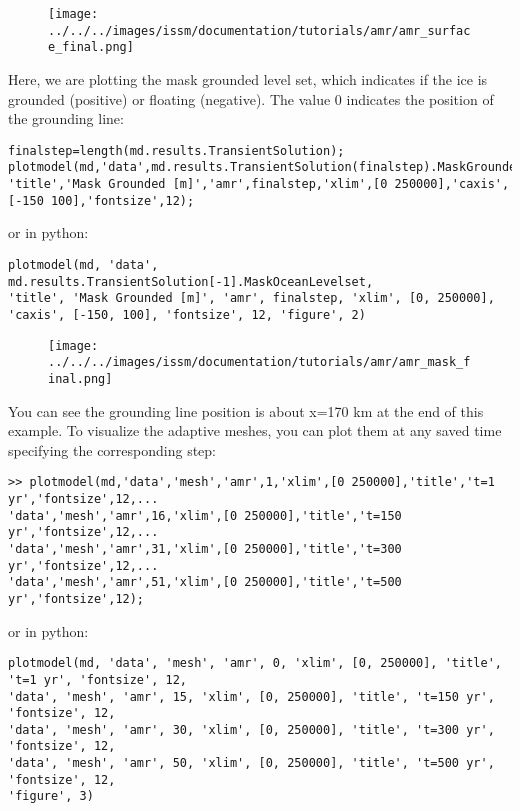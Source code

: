 \begin{figure}[H]
	\begin{center}
		\texttt{[image: ../../../images/issm/documentation/tutorials/amr/amr\_surface\_final.png]}
	\end{center}
\end{figure}

Here, we are plotting the mask grounded level set, which indicates if the ice is grounded (positive) or floating (negative). The value 0 indicates the position of the grounding line:
\begin{verbatim}finalstep=length(md.results.TransientSolution);
plotmodel(md,'data',md.results.TransientSolution(finalstep).MaskGroundediceLevelset,...
'title','Mask Grounded [m]','amr',finalstep,'xlim',[0 250000],'caxis',[-150 100],'fontsize',12);\end{verbatim}
or in python:
\begin{verbatim}plotmodel(md, 'data', md.results.TransientSolution[-1].MaskOceanLevelset,
'title', 'Mask Grounded [m]', 'amr', finalstep, 'xlim', [0, 250000], 'caxis', [-150, 100], 'fontsize', 12, 'figure', 2)\end{verbatim}

\begin{figure}[H]
	\begin{center}
		\texttt{[image: ../../../images/issm/documentation/tutorials/amr/amr\_mask\_final.png]}
	\end{center}
\end{figure}

You can see the grounding line position is about x=170 km at the end of this example. To visualize the adaptive meshes, you can plot them at any saved time specifying the corresponding step:
\begin{verbatim}>> plotmodel(md,'data','mesh','amr',1,'xlim',[0 250000],'title','t=1 yr','fontsize',12,...
'data','mesh','amr',16,'xlim',[0 250000],'title','t=150 yr','fontsize',12,...
'data','mesh','amr',31,'xlim',[0 250000],'title','t=300 yr','fontsize',12,...
'data','mesh','amr',51,'xlim',[0 250000],'title','t=500 yr','fontsize',12);\end{verbatim}
or in python:
\begin{verbatim}plotmodel(md, 'data', 'mesh', 'amr', 0, 'xlim', [0, 250000], 'title', 't=1 yr', 'fontsize', 12,
'data', 'mesh', 'amr', 15, 'xlim', [0, 250000], 'title', 't=150 yr', 'fontsize', 12,
'data', 'mesh', 'amr', 30, 'xlim', [0, 250000], 'title', 't=300 yr', 'fontsize', 12,
'data', 'mesh', 'amr', 50, 'xlim', [0, 250000], 'title', 't=500 yr', 'fontsize', 12,
'figure', 3)\end{verbatim}

